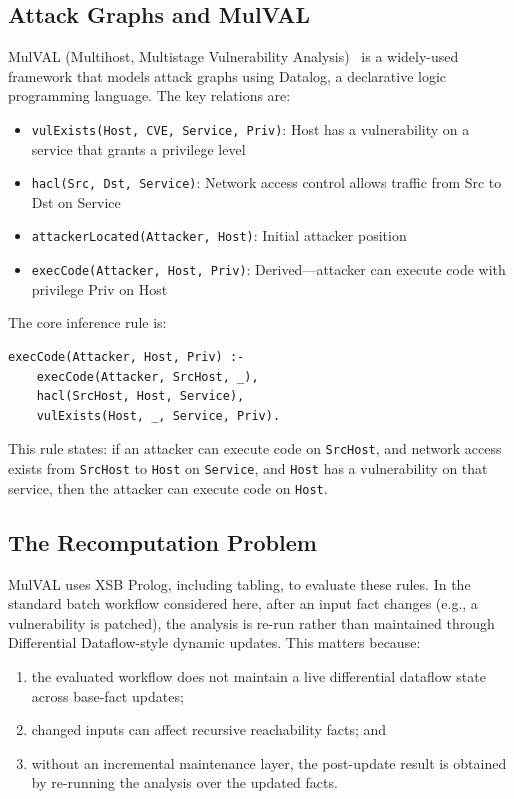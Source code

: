 \documentclass[conference]{IEEEtran}
\begin{document}
\subsection{Attack Graphs and MulVAL}

MulVAL (Multihost, Multistage Vulnerability Analysis)~\cite{ou2006mulval} is a widely-used framework that models attack graphs using Datalog, a declarative logic programming language. The key relations are:

\begin{itemize}
    \item \texttt{vulExists(Host, CVE, Service, Priv)}: Host has a vulnerability on a service that grants a privilege level
    \item \texttt{hacl(Src, Dst, Service)}: Network access control allows traffic from Src to Dst on Service
    \item \texttt{attackerLocated(Attacker, Host)}: Initial attacker position
    \item \texttt{execCode(Attacker, Host, Priv)}: Derived---attacker can execute code with privilege Priv on Host
\end{itemize}

The core inference rule is:

\begin{lstlisting}[style=datalog, caption={MulVAL lateral movement rule}]
execCode(Attacker, Host, Priv) :-
    execCode(Attacker, SrcHost, _),
    hacl(SrcHost, Host, Service),
    vulExists(Host, _, Service, Priv).
\end{lstlisting}

This rule states: if an attacker can execute code on \texttt{SrcHost}, and network access exists from \texttt{SrcHost} to \texttt{Host} on \texttt{Service}, and \texttt{Host} has a vulnerability on that service, then the attacker can execute code on \texttt{Host}.

\subsection{The Recomputation Problem}

MulVAL uses XSB Prolog, including tabling, to evaluate these rules. In the
standard batch workflow considered here, after an input fact changes (e.g., a
vulnerability is patched), the analysis is re-run rather than maintained through
Differential Dataflow-style dynamic updates. This matters because:

\begin{enumerate}
    \item the evaluated workflow does not maintain a live differential dataflow
    state across base-fact updates;
    \item changed inputs can affect recursive reachability facts; and
    \item without an incremental maintenance layer, the post-update result is
    obtained by re-running the analysis over the updated facts.
\end{enumerate}
\end{document}

